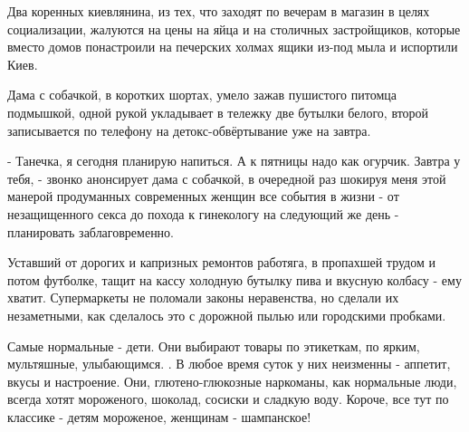 Два коренных киевлянина, из тех, что заходят по вечерам в магазин в целях
социализации, жалуются на цены на яйца и на столичных застройщиков, которые
вместо домов понастроили на печерских холмах ящики из-под мыла и испортили
Киев. 

Дама с собачкой, в коротких шортах, умело зажав пушистого питомца подмышкой,
одной рукой укладывает в тележку две бутылки белого, второй записывается по
телефону на детокс-обвёртывание уже на завтра. 

- Танечка, я сегодня планирую напиться. А к пятницы надо как огурчик. Завтра у
тебя, - звонко анонсирует дама с собачкой, в очередной раз шокируя  меня этой
манерой продуманных современных женщин все события в жизни - от незащищенного
секса до похода к гинекологу на следующий же день - планировать
заблаговременно. 

Уставший от дорогих и капризных ремонтов работяга, в пропахшей трудом и потом
футболке, тащит на кассу холодную бутылку пива и вкусную колбасу - ему хватит.
Супермаркеты не поломали законы неравенства, но сделали их незаметными, как
сделалось это с дорожной пылью или городскими пробками. 

Самые нормальные - дети. Они выбирают товары по этикеткам, по ярким,
мультяшные, улыбающимся. . В любое время суток у них неизменны - аппетит, вкусы
и настроение. Они, глютено-глюкозные наркоманы, как нормальные люди, всегда
хотят мороженого, шоколад, сосиски и сладкую воду. Короче, все тут по классике
- детям мороженое, женщинам - шампанское!

